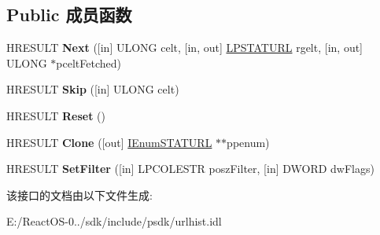 \subsection*{Public 成员函数}
\begin{DoxyCompactItemize}
\item 
\mbox{\label{interface_i_enum_s_t_a_t_u_r_l_a1e9b2cb7bad891b8b9d7bad2900b79b6}} 
H\+R\+E\+S\+U\+LT {\bfseries Next} (\mbox{[}in\mbox{]} U\+L\+O\+NG celt, \mbox{[}in, out\mbox{]} \hyperlink{struct_i_enum_s_t_a_t_u_r_l_1_1___s_t_a_t_u_r_l}{L\+P\+S\+T\+A\+T\+U\+RL} rgelt, \mbox{[}in, out\mbox{]} U\+L\+O\+NG $\ast$pcelt\+Fetched)
\item 
\mbox{\label{interface_i_enum_s_t_a_t_u_r_l_a12c8d674cf8eabb6618d9dd753212170}} 
H\+R\+E\+S\+U\+LT {\bfseries Skip} (\mbox{[}in\mbox{]} U\+L\+O\+NG celt)
\item 
\mbox{\label{interface_i_enum_s_t_a_t_u_r_l_acdb24f12bdace4b5274fcd245dd255b7}} 
H\+R\+E\+S\+U\+LT {\bfseries Reset} ()
\item 
\mbox{\label{interface_i_enum_s_t_a_t_u_r_l_ad2f53f351dcf6f56e97cd8efa5dcd844}} 
H\+R\+E\+S\+U\+LT {\bfseries Clone} (\mbox{[}out\mbox{]} \hyperlink{interface_i_enum_s_t_a_t_u_r_l}{I\+Enum\+S\+T\+A\+T\+U\+RL} $\ast$$\ast$ppenum)
\item 
\mbox{\label{interface_i_enum_s_t_a_t_u_r_l_a64615a900671e362df82885f0283aaea}} 
H\+R\+E\+S\+U\+LT {\bfseries Set\+Filter} (\mbox{[}in\mbox{]} L\+P\+C\+O\+L\+E\+S\+TR posz\+Filter, \mbox{[}in\mbox{]} D\+W\+O\+RD dw\+Flags)
\end{DoxyCompactItemize}


该接口的文档由以下文件生成\+:\begin{DoxyCompactItemize}
\item 
E\+:/\+React\+O\+S-\/0../sdk/include/psdk/urlhist.\+idl\end{DoxyCompactItemize}
